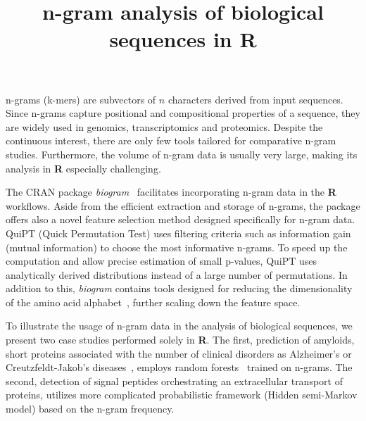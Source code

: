 \documentclass[a4paper,10pt]{article}
\title{n-gram analysis of biological sequences in R}
\author{}
\date{}
\begin{document}
\maketitle

n-grams (k-mers) are subvectors of $n$ characters derived from input sequences. 
Since n-grams capture positional and compositional properties of a sequence, 
they are widely used in genomics, transcriptomics and proteomics. Despite the 
continuous interest, there are only few tools tailored for comparative n-gram 
studies. Furthermore, the volume of n-gram data is usually very large, making 
its analysis in \textbf{R} especially challenging. 

The CRAN package \textit{biogram}~\citep{burdukiewicz_biogram:_2015} facilitates 
incorporating n-gram data in the \textbf{R} workflows. Aside from the efficient 
extraction and storage of n-grams, the package offers also a novel feature 
selection method designed specifically for n-gram data. QuiPT (Quick 
Permutation Test) uses filtering criteria such as information gain 
(mutual information) to choose the most informative n-grams. To speed up the 
computation and allow precise estimation of small p-values, QuiPT uses 
analytically derived distributions instead of a large number of permutations. In 
addition to this, \textit{biogram} contains tools designed for reducing the 
dimensionality of the amino acid alphabet~\citep{murphy_simplified_2000}, 
further scaling down the feature space.

To illustrate the usage of n-gram data in the analysis of biological sequences,  
we present two case studies performed solely in \textbf{R}. The first,   
prediction of amyloids, short proteins associated with the number of clinical   
disorders as Alzheimer's or Creutzfeldt-Jakob’s 
diseases~\citep{fandrich_oligomeric_2012}, employs random 
forests~\citep{wright_ranger:_2015} trained on n-grams. The second, detection   
of signal peptides orchestrating an extracellular transport of proteins, 
utilizes more complicated probabilistic framework (Hidden semi-Markov 
model) based on the n-gram frequency. 


\end{document}
